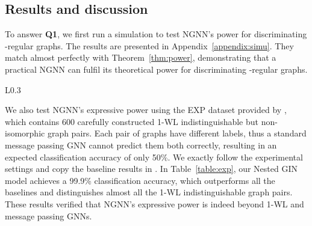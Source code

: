 \documentclass{article}
\begin{document}
\subsection{Results and discussion}

To answer \textbf{Q1}, we first run a simulation to test NGNN's power for discriminating -regular graphs. The results are presented in Appendix~\ref{appendix:simu}. They match almost perfectly with Theorem~\ref{thm:power}, demonstrating that a practical NGNN can fulfil its theoretical power for discriminating -regular graphs. 


\begin{wraptable}[8]{L}{0.3\textwidth}
\large
\setlength{\tabcolsep}{13pt}
\vspace{-10pt}
\end{wraptable}

We also test NGNN's expressive power using the EXP dataset provided by \citep{abboud2020surprising}, which contains 600 carefully constructed 1-WL indistinguishable but non-isomorphic graph pairs. Each pair of graphs have different labels, thus a standard message passing GNN cannot predict them both correctly, resulting in an expected classification accuracy of only 50\%. We exactly follow the experimental settings and copy the baseline results in \citep{abboud2020surprising}. In Table~\ref{table:exp}, our Nested GIN model achieves a 99.9\% classification accuracy, which outperforms all the baselines and distinguishes almost all the 1-WL indistinguishable graph pairs. 
These results verified that NGNN's expressive power is indeed beyond 1-WL and message passing GNNs.
\end{document}
